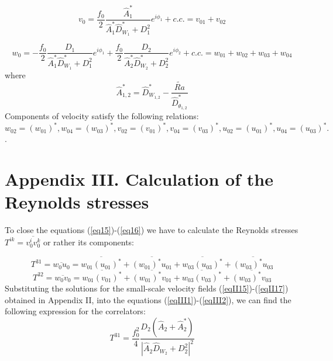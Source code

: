 \documentclass [12pt]{article}
\begin{document}
\begin{equation} \label{eqII16}
 v_{0} =\frac{f_{0} }{2} \frac{\widehat A_{1}^{*} }{\widehat A_{1}^{*}\widehat{D}_{W_{1} }^{*}
+D_{1}^{2} } e^{i\phi _{1} } +c.c.=v_{01} +v_{02}
\end{equation}

\begin{equation} \label{eqII17}
 w_{0} =-\frac{f_{0} }{2} \frac{D_{1} }{\widehat A_{1}^{*}\widehat{D}_{W_{1} }^{*}
+D_{1}^{2} } e^{i\phi _{1} } +\frac{f_{0} }{2} \frac{D_{2} }{\widehat A_{2}^{*}\widehat{D}_{W_{2} }^{*} +D_{2}^{2}
} e^{i\phi _{2} } +c.c.=w_{01} +w_{02} +w_{03} +w_{04}
\end{equation}
where
\begin{equation} \label{eqII18}
\widehat A_{1,2}^{*} =\widehat{D}_{W_{1,2} }^{*} -\frac{\widetilde{Ra} }{\widehat{D}_{\theta_{1,2}
}^{*} } \end{equation}
Components of velocity satisfy the following relations:
\[w_{02} =\left(w_{01}
\right)^{*} , w_{04} =\left(w_{03} \right)^{*} , v_{02} =\left(v_{01} \right)^{*}
, v_{04} =\left(v_{03} \right)^{*} ,  u_{02} =\left(u_{01} \right)^{*} , u_{04} =\left(u_{03} \right)^{*}.  \].

\section*{Appendix III. Calculation of the Reynolds stresses}

To close the equations (\ref{eq15})-(\ref{eq16}) we have to calculate the Reynolds stresses $T^{ik} =\overline{v_{0}^{i} v_{0}^{k} }$ or rather its components:

\begin{equation}\label{eqIII1}
  T^{31} =\overline{w_{0} u_{0} }=\overline{w_{01} \left(u_{01}
\right)^{*} }+\overline{\left(w_{01} \right)^{*} u_{01} }+\overline{w_{03} \left(u_{03}
\right)^{*} }+\overline{\left(w_{03} \right)^{*} u_{03} }
\end{equation}
\begin{equation} \label{eqIII2}
  T^{32} =\overline{w_{0} v_{0} }=\overline{w_{01}
\left(v_{01} \right)^{*} }+\overline{\left(w_{01} \right)^{*} v_{01} }+\overline{w_{03}
\left(v_{03} \right)^{*} }+\overline{\left(w_{03} \right)^{*} v_{03} }
\end{equation}
Substituting the solutions for the small-scale velocity fields (\ref{eqII15})-(\ref{eqII17}) obtained in Appendix II, into the equations (\ref{eqIII1})-(\ref{eqIII2}), we can find the following expression for the correlators:
\begin{equation} \label{eqIII3}
 T^{31} =\frac{f_{0}^{2} }{4} \frac{D_{2}(\widehat A_{2}+\widehat A_{2}^{*})
}{\left|\widehat A_{2}\widehat{D}_{W_{2} } +D_{2}^{2} \right|^{2} }
\end{equation}
\end{document}
